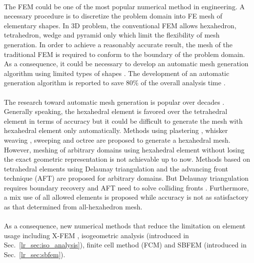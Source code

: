\paragraph{}
The FEM could be one of the most popular numerical method in engineering.
A necessary procedure is to discretize the problem domain into FE mesh of elementary shapes.
In 3D problem, the conventional FEM allows hexahedron, tetrahedron, wedge and pyramid only which limit the flexibility of mesh generation.
In order to achieve a reasonably accurate result, the mesh of the traditional FEM is required to conform to the boundary of the problem domain.
As a consequence, it could be necessary to develop an automatic mesh generation algorithm using limited types of shapes \citep{Frey:2007:MGA:1205626}.
The development of an automatic generation algorithm is reported to save 80\% of the overall analysis time \citep{Hug2005}.

\paragraph{}
The research toward automatic mesh generation is popular over decades \citep{owen2000,Blacker1993,doi:10.1002/fld.1650081003,doi:10.1093/comjnl/24.2.167}.
Generally speaking, the hexahedral element is favored over the tetrahedral element in terms of accuracy but it could be difficult to generate the mesh with hexahedral element only automatically.
Methods using plastering \citep{Blacker1993}, whisker weaving \citep{Tau1984}, sweeping \citep{Staten1999} and octree \citep{doi:10.1002/nme.1620201103} are proposed to generate a hexahedral mesh.
However, meshing of arbitrary domains using hexahedral element without losing the exact geometric representation is not achievable up to now.
Methods based on tetrahedral elements using Delaunay triangulation \citep{doi:10.1093/comjnl/24.2.167} and the advancing front technique (AFT) \citep{doi:10.1002/fld.1650081003} are proposed for arbitrary domains.
But Delaunay triangulation requires boundary recovery \citep{doi:10.1002/nme.808,LIU201432} and AFT need to solve colliding fronts \citep{Shewchuk1997}.
Furthermore, a mix use of all allowed elements \citep{owen2000} is proposed while accuracy is not as satisfactory as that determined from all-hexahedron mesh.

\paragraph{}
As a consequence, new numerical methods that reduce the limitation on element usage including X-FEM \citep{Moes1999}, isogeometric analysis \citep{Hug2005} (introduced in Sec.~\ref{lr_sec:iso_analysis}), finite cell method (FCM) \citep{Parvizian2007} and SBFEM \citep{Wol2003} (introduced in Sec.~\ref{lr_sec:sbfem}).

